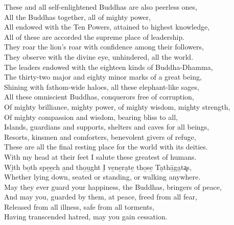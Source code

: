 \clearpage

\englishText

\begin{onechants}
These and all self-enlightened Buddhas are also peerless ones,\\
All the Buddhas together, all of mighty power,\\
All endowed with the Ten Powers, attained to highest knowledge,\\
All of these are accorded the supreme place of leadership.\\
They roar the lion's roar with confidence among their followers,\\
They observe with the divine eye, unhindered, all the world.\\
The leaders endowed with the eighteen kinds of Buddha-Dhamma,\\
The thirty-two major and eighty minor marks of a great being,\\
Shining with fathom-wide haloes, all these elephant-like sages,\\
All these omniscient Buddhas, conquerors free of corruption,\\
Of mighty brilliance, mighty power, of mighty wisdom, mighty strength,\\
Of mighty compassion and wisdom, bearing bliss to all,\\
Islands, guardians and supports, shelters and caves for all beings,\\
Resorts, kinsmen and comforters, benevolent givers of refuge,\\
These are all the final resting place for the world with its deities.\\
With my head at their feet I salute these greatest of humans.\\
Wi̱th bo̱th spe̱e̱ch a̱nd tho̱u̱ght I̮ ve̱ne̱ra̮te̱ tho̱se̱ Ta̮thā̱ga̮ta͓s,\\
Whether lying down, seated or standing, or walking anywhere.\\
May they ever guard your happiness, the Buddhas, bringers of peace,\\
And may you, guarded by them, at peace, freed from all fear,\\
Released from all illness, safe from all torments,\\
Having transcended hatred, may you gain cessation.\\
\end{onechants}

\clearpage

